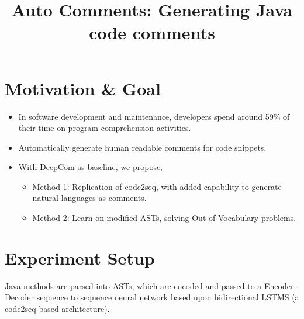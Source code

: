 \documentclass{tudelftposter}
\title{Auto Comments: Generating Java code comments}
\begin{document}
\section{Motivation \& Goal}
\begin{itemize}
    \item In software development and maintenance, developers spend around 59\% of their time on program comprehension activities.
    \item Automatically generate human readable comments for code snippets.
    \item With DeepCom as baseline, we propose,
    \begin{itemize}
        \item Method-1: Replication of code2seq, with added capability to generate natural languages as comments.
        \item Method-2: Learn on modified ASTs, solving Out-of-Vocabulary problems.
    \end{itemize}
\end{itemize}

\section{Experiment Setup}
Java methods are parsed into ASTs, which are encoded and passed to a Encoder-Decoder sequence to sequence neural network based upon bidirectional LSTMS (a code2seq based architecture). 
\end{document}
